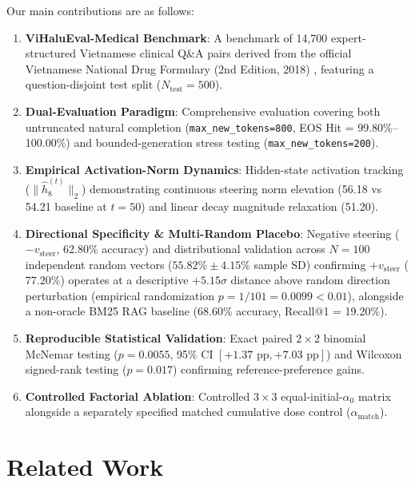 \documentclass[conference]{IEEEtran}
\begin{document}
Our main contributions are as follows:
\begin{enumerate}
    \item \textbf{ViHaluEval-Medical Benchmark}: A benchmark of 14,700 expert-structured Vietnamese clinical Q\&A pairs derived from the official Vietnamese National Drug Formulary (2nd Edition, 2018) \cite{ref6}, featuring a question-disjoint test split ($N_{\text{test}}=500$).
    \item \textbf{Dual-Evaluation Paradigm}: Comprehensive evaluation covering both untruncated natural completion (\texttt{max\_new\_tokens=800}, EOS Hit = 99.80\%--100.00\%) and bounded-generation stress testing (\texttt{max\_new\_tokens=200}).
    \item \textbf{Empirical Activation-Norm Dynamics}: Hidden-state activation tracking ($\|\hat{h}_8^{(t)}\|_2$) demonstrating continuous steering norm elevation (56.18 vs 54.21 baseline at $t=50$) and linear decay magnitude relaxation (51.20).
    \item \textbf{Directional Specificity \& Multi-Random Placebo}: Negative steering ($-v_{\text{steer}}$, 62.80\% accuracy) and distributional validation across $N=100$ independent random vectors ($55.82\% \pm 4.15\%$ sample SD) confirming $+v_{\text{steer}}$ ($77.20\%$) operates at a descriptive $+5.15\sigma$ distance above random direction perturbation (empirical randomization $p=1/101=0.0099 < 0.01$), alongside a non-oracle BM25 RAG baseline (68.60\% accuracy, Recall@1 = 19.20\%).
    \item \textbf{Reproducible Statistical Validation}: Exact paired $2\times 2$ binomial McNemar testing ($p=0.0055$, 95\% CI $[+1.37\text{ pp}, +7.03\text{ pp}]$) and Wilcoxon signed-rank testing ($p=0.017$) confirming reference-preference gains.
    \item \textbf{Controlled Factorial Ablation}: Controlled $3\times 3$ equal-initial-$\alpha_0$ matrix alongside a separately specified matched cumulative dose control ($\alpha_{\text{match}}$).
\end{enumerate}

\section{Related Work}
\end{document}
